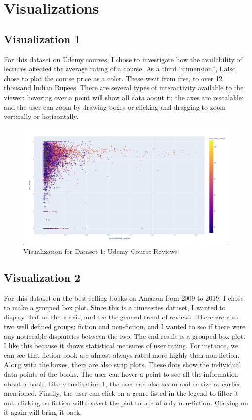\documentclass{article}
\begin{document}
\section{Visualizations}
\subsection{Visualization 1}
For this dataset on Udemy courses, I chose to investigate how the availability of lectures affected the average rating of a course. As a third ``dimension'', I also chose to plot the course price as a color. These went from free, to over 12 thousand Indian Rupees. There are several types of interactivity available to the viewer: hovering over a point will show all data about it; the axes are rescalable; and the user can zoom by drawing boxes or clicking and dragging to zoom vertically or horizontally.

\begin{figure}[h]
\caption{Visualization for Dataset 1: Udemy Course Reviews}
\centering
\includegraphics[width=\textwidth]{Screenshot_Index01.png}
\end{figure}

\subsection{Visualization 2}
For this dataset on the best selling books on Amazon from 2009 to 2019, I chose to make a grouped box plot. Since this is a timeseries dataset, I wanted to display that on the x-axis, and see the general trend of reviews. There are also two well defined groups: fiction and non-fiction, and I wanted to see if there were any noticeable disparities between the two. The end result is a grouped box plot. I like this because it shows statistical measures of user rating. For instance, we can see that fiction book are almost always rated more highly than non-fiction.  Along with the boxes, there are also strip plots. These dots show the individual data points of the books. The user can hover a point to see all the information about a book. Like visualization 1, the user can also zoom and re-size as earlier mentioned. Finally, the user can click on a genre listed in the legend to filter it out: clicking on fiction will convert the plot to one of only non-fiction. Clicking on it again will bring it back. 
\end{document}
